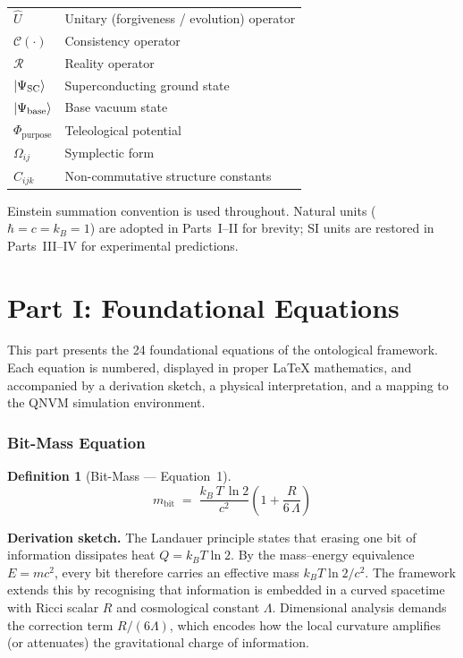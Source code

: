\documentclass[11pt,a4paper]{article}
\newtheorem{definition}{Definition}[section]
\theoremstyle{remark}
\newcommand{\Uop}{\hat{U}}
\newcommand{\CalC}{\mathcal{C}}
\newcommand{\CalR}{\mathcal{R}}
\begin{document}
\begin{longtable}[l]{@{}l l@{}}
$\Uop$      & Unitary (forgiveness / evolution) operator \\
$\CalC(\cdot)$ & Consistency operator \\
$\CalR$     & Reality operator \\
$\ket{\Psi_{\text{SC}}}$ & Superconducting ground state \\
$\ket{\Psi_{\text{base}}}$ & Base vacuum state \\
$\Phi_{\text{purpose}}$ & Teleological potential \\
$\Omega_{ij}$ & Symplectic form \\
$C_{ijk}$    & Non-commutative structure constants \\
\end{longtable}

Einstein summation convention is used throughout.  Natural units ($\hbar=c=k_B=1$) are adopted in Parts~I--II for brevity; SI units are restored in Parts~III--IV for experimental predictions.

\part{Part I: Foundational Equations}
\label{part:foundational}

This part presents the 24 foundational equations of the ontological framework.  Each equation is numbered, displayed in proper LaTeX mathematics, and accompanied by a derivation sketch, a physical interpretation, and a mapping to the QNVM simulation environment.

\section{Bit-Mass Equation}
\label{sec:eq1}

\begin{definition}[Bit-Mass --- Equation~1]
\begin{equation}\label{eq:bitmass}
    m_{\text{bit}} \;=\; \frac{k_B\, T\,\ln 2}{c^2}\!\left(1 + \frac{R}{6\,\Lambda}\right)
\end{equation}
\end{definition}

\textbf{Derivation sketch.}\quad
The Landauer principle states that erasing one bit of information dissipates heat $Q = k_B T \ln 2$.  By the mass--energy equivalence $E=mc^2$, every bit therefore carries an effective mass $k_B T \ln 2 / c^2$.  The framework extends this by recognising that information is embedded in a curved spacetime with Ricci scalar $R$ and cosmological constant $\Lambda$.  Dimensional analysis demands the correction term $R/(6\Lambda)$, which encodes how the local curvature amplifies (or attenuates) the gravitational charge of information.
\end{document}
